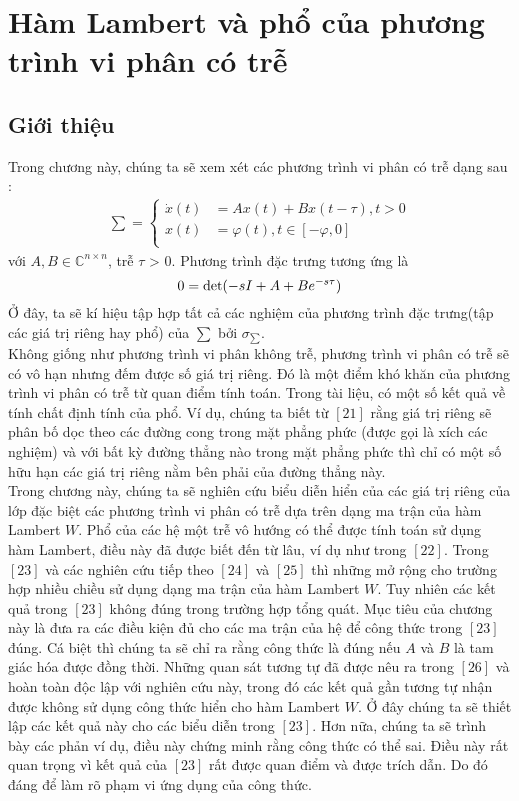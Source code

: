 \chapter{Hàm Lambert và phổ của phương trình vi phân có trễ}
\section{Giới thiệu}
Trong chương này, chúng ta sẽ xem xét các phương trình vi phân có trễ dạng sau :
\begin{align}
\sum = \begin{cases}
\dot{x}(t) &= Ax(t) + Bx(t-\tau), t > 0\\
x(t) &= \varphi(t) , t \in [-\varphi,0] \\
\end{cases} 
\end{align}
với $A, B  \in \mathbb{C}^{n \times n}$, trễ $\tau$ > 0. Phương trình đặc trưng tương ứng là
$$ 0 = \det (-sI + A + Be^{-s\tau}) \\$$
Ở đây, ta sẽ kí hiệu tập hợp tất cả các nghiệm  của phương trình đặc trưng(tập các giá trị riêng hay phổ) của $\sum$ bởi $\sigma_{\sum}$. \\
Không giống như phương trình vi phân không trễ, phương trình vi phân có trễ sẽ có vô hạn nhưng đếm được số giá trị riêng. Đó là một điểm khó khăn của phương trình vi phân có trễ từ quan điểm tính toán. Trong tài liệu, có một số kết quả về tính chất định tính của phổ. Ví dụ, chúng ta biết từ $[21]$ rằng giá trị riêng sẽ phân bố dọc theo các đường cong trong mặt phẳng phức (được gọi là xích các nghiệm) và với bất kỳ đường thẳng nào trong mặt phẳng phức thì chỉ có một số hữu hạn các giá trị riêng nằm bên phải của đường thẳng này.\\
Trong chương này, chúng ta sẽ nghiên cứu biểu diễn hiển của các giá trị riêng của lớp đặc biệt các phương trình vi phân có trễ dựa trên dạng ma trận của hàm Lambert $W$. Phổ của các hệ một trễ vô hướng có thể được tính toán sử dụng hàm Lambert, điều này đã được biết đến từ lâu, ví dụ như trong $[22]$. Trong $[23]$ và các nghiên cứu tiếp theo $[24]$ và $[25]$ thì những mở rộng cho trường hợp nhiều chiều sử dụng dạng ma trận của hàm Lambert $W$. Tuy nhiên các kết quả trong $[23]$ không đúng trong trường hợp tổng quát. Mục tiêu của chương này là đưa ra các điều kiện đủ cho các ma trận của hệ để công thức trong $[23]$ đúng. Cá biệt thì chúng ta sẽ chỉ ra rằng công thức là đúng nếu $A$ và $B$ là tam giác hóa được đồng thời. Những quan sát tương tự đã được nêu ra trong $[26]$ và hoàn toàn độc lập với nghiên cứu này, trong đó các kết quả gần tương tự nhận được không sử dụng công thức hiển cho hàm Lambert $W$. Ở đây chúng ta sẽ thiết lập các kết quả này cho các biểu diễn trong $[23]$. Hơn nữa, chúng ta sẽ trình bày các phản ví dụ, điều này chứng minh rằng công thức có thể sai. Điều này rất quan trọng vì kết quả của $[23]$ rất được quan điểm và được trích dẫn. Do đó đáng để làm rõ phạm vi ứng dụng của công thức.

